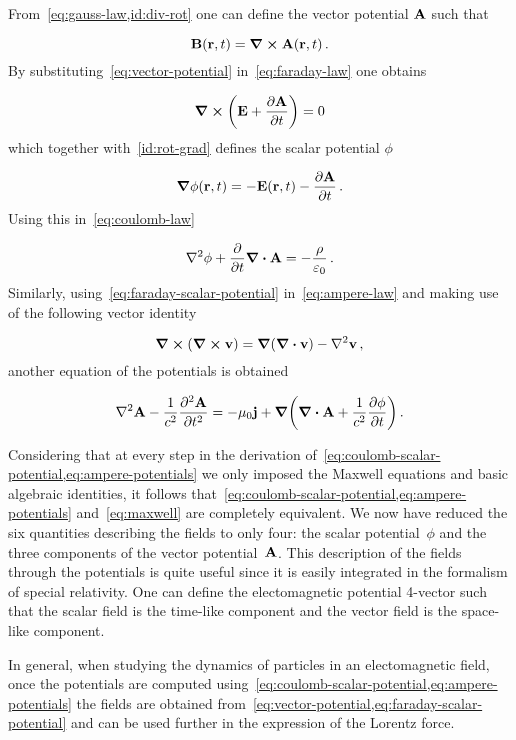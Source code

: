 \documentclass[12pt, class=report, crop=false]{standalone}
\begin{document}
\par
From~\cref{eq:gauss-law,id:div-rot} one can define the vector potential \(\vb{A}\) such that

\begin{equation}
  \label{eq:vector-potential}
  \vb{B}(\vb{r}, t) = \curl{\vb{A}(\vb{r}, t)}\,.
\end{equation}
By substituting~\eqref{eq:vector-potential} in~\eqref{eq:faraday-law} one obtains

\begin{equation}
  \label{eq:faraday-vector-potential}
  \curl(\vb{E} + \pdv{\vb{A}}{t}) = 0
\end{equation}
which together with~\cref{id:rot-grad} defines the scalar potential \(\phi\)

\begin{equation}
  \label{eq:faraday-scalar-potential}
  \grad{\phi}(\vb{r}, t) = -\vb{E}(\vb{r}, t) - \pdv{\vb{A}}{t}\,.
\end{equation}
Using this in~\cref{eq:coulomb-law}

\begin{equation}
  \label{eq:coulomb-scalar-potential}
  \laplacian{\phi} + \pdv{t}\div{\vb{A}} = - \frac{\rho}{\varepsilon_0}\,.
\end{equation}
Similarly, using~\cref{eq:faraday-scalar-potential} in~\cref{eq:ampere-law} and making use of the following vector identity

\begin{equation}
  \label{eq:curl-of-curl}
  \curl(\curl{\vb{v}}) = \grad(\div{\vb{v}}) - \laplacian{\vb{v}}\,,
\end{equation}
another equation of the potentials is obtained

\begin{equation}
  \label{eq:ampere-potentials}
  \laplacian{\vb{A}} - \frac{1}{c^2}\pdv[2]{\vb{A}}{t} =
    -\mu_0 \vb{j} + \grad(\div{\vb{A}} + \frac{1}{c^2} \pdv{\phi}{t})\,.
\end{equation}

Considering that at every step in the derivation of~\cref{eq:coulomb-scalar-potential,eq:ampere-potentials} we only imposed the Maxwell equations and basic algebraic identities, it follows that~\cref{eq:coulomb-scalar-potential,eq:ampere-potentials} and~\cref{eq:maxwell} are completely equivalent. We now have reduced the six quantities describing the fields to only four: the scalar potential~\(\phi\) and the three components of the vector potential~\(\vb{A}\). This description of the fields through the potentials is quite useful since it is easily integrated in the formalism of special relativity. One can define the electomagnetic potential 4-vector such that the scalar field is the time-like component and the vector field is the space-like component.
\par
In general, when studying the dynamics of particles in an electomagnetic field, once the potentials are computed using~\cref{eq:coulomb-scalar-potential,eq:ampere-potentials} the fields are obtained from~\cref{eq:vector-potential,eq:faraday-scalar-potential} and can be used further in the expression of the Lorentz force.
\end{document}

